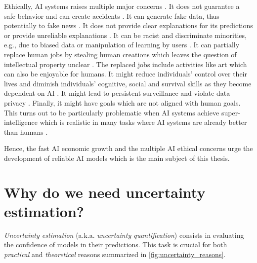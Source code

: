 Ethically, AI systems raises multiple major concerns \cite{bartneck2021ethic}.
It does not guarantee a safe behavior and can create accidents \cite{amodei2019problems}.
It can generate fake data, thus potentially to fake news \cite{nguyen2022deepfakes}.
It does not provide clear explanations for its predictions or provide unreliable explanations \cite{overview-interpretable-ml,interpretable-ml, krishnan2020against}.
It can be racist and discriminate minorities, e.g., due to biased data or manipulation of learning by users \cite{mehrabi2019fairness}.
It can partially replace human jobs by stealing human creations which leaves the question of intellectual property unclear \cite{moerland2022intellectual, gervais2020intellectual}. The replaced jobs include activities like art which can also be enjoyable for humans.
It might reduce individuals’ control over their lives and diminish individuals’ cognitive, social and survival skills as they become dependent on AI \cite{anderson2018concerns}.
It might lead to persistent surveillance and violate data privacy \cite{bartneck2021privacy}.
Finally, it might have goals which are not aligned with human goals. This turns out to be particularly problematic when AI systems achieve super-intelligence \cite{bostrom2014superintelligence} which is realistic in many tasks where AI systems are already better than humans \cite{firestone2020performance}.

Hence, the fast AI economic growth and the multiple AI ethical concerns urge the development of reliable AI models which is the main subject of this thesis.

\section{Why do we need uncertainty estimation?}
\label{sec:why_uncertainty}

\emph{Uncertainty estimation} (a.k.a. \emph{uncertainty quantification}) consists in evaluating the confidence of models in their predictions. This task is crucial for both \emph{practical} and \emph{theoretical} reasons summarized in \cref{fig:uncertainty_reasons}.

